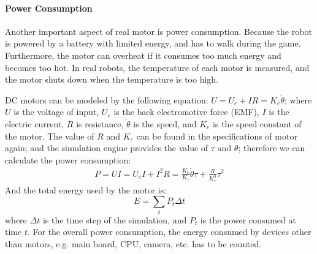 \documentclass{llncs}
\newcommand{\inputtikz}[1]
{
  \StrSubstitute{#1}{/}{.}[\fn]
  \scancs{\filename}{\fn}
  \tikzsetfigurename{\filename}
  
}
\begin{document}
\paragraph{Power Consumption}
Another important aspect of real motor is power consumption.
Because the robot is powered by a battery with limited energy, and has to walk during the
game.
Furthermore, the motor can overheat if it consumes too much energy and becomes too hot.
In real robots, the temperature of each motor is measured, and the motor shuts down 
when the temperature is too high.

DC motors can be modeled by the following equation:
$U = U_e + IR \label{eq:u-ir} = K_e \dot{\theta} \label{eq:u-ke}$;
where $U$ is the voltage of input, $U_e$ is the back electromotive
force (EMF), $I$ is the electric current, $R$ is resistance,
$\dot{\theta}$ is the speed, and $K_e$ is the speed constant of the motor.
The value of $R$ and $K_e$ can be found in the specifications of motor again;
and the simulation engine provides
the value of $\tau$ and $\dot{\theta}$; therefore we can calculate the
power consumption:
\begin{align}
  P = UI = U_eI + I^2R = \frac{K_e}{K_\tau}\dot{\theta}\tau + \frac{R}{K_\tau^2}\tau^2
\end{align}
And the total energy used by the motor is:
\begin{equation}
  \label{eq:motor-power}
  E = \sum_t{P_t\Delta{}t}
\end{equation}
where $\Delta{}t$ is the time step of the simulation, and $P_t$ is the power consumed at time $t$. For the overall
power consumption, the energy consumed by devices other than motors,
e.g. main board, CPU, camera, etc. has to be counted.

\end{document}
